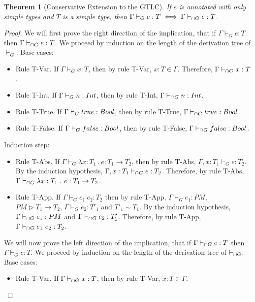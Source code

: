 \documentclass[a4paper]{article}
\newtheorem{theorem}{Theorem}[section]
\begin{document}
\begin{theorem}[Conservative Extension to the GTLC]
\label{conservative_extension_intersection_type_system}
If $e$ is annotated with only simple types and $T$ is a simple type, then $\Gamma \vdash_{G} e : T \iff \Gamma \vdash_{\cap G} e : T$.
\end{theorem}
\begin{proof}
We will first prove the right direction of the implication, that if $\Gamma \vdash_{G} e : T$ then $\Gamma \vdash_{\cap G} e : T$.
We proceed by induction on the length of the derivation tree of $\vdash_{G}$.
Base cases:
\begin{itemize}
    \item Rule T-Var.
    If $\Gamma \vdash_{G} x : T$, then by rule T-Var, $x : T \in \Gamma$.
    Therefore, $\Gamma \vdash_{\cap G} x : T$.
    \item Rule T-Int.
    If $\Gamma \vdash_{G} n : {Int}$, then by rule T-Int, $\Gamma \vdash_{\cap G} n : {Int}$.
    \item Rule T-True.
    If $\Gamma \vdash_{G} true : Bool$, then by rule T-True, $\Gamma \vdash_{\cap G} true : Bool$.
    \item Rule T-False.
    If $\Gamma \vdash_{G} false : Bool$, then by rule T-False, $\Gamma \vdash_{\cap G} false : Bool$.
\end{itemize}
Induction step:
\begin{itemize}
    \item Rule T-Abs.
    If $\Gamma \vdash_{G} \lambda x : T_1\ .\ e : T_1 \rightarrow T_2$, then by rule T-Abs, $\Gamma, x : T_1 \vdash_{G} e : T_2$.
        By the induction hypothesis, $\Gamma, x : T_1 \vdash_{\cap G} e : T_2$.
        Therefore, by rule T-Abs, $\Gamma \vdash_{\cap G} \lambda x : T_1\ .\ e : T_1 \rightarrow T_2$.
    \item Rule T-App.
    If $\Gamma \vdash_{G} e_1\ e_2 : T_2$ then by rule T-App, $\Gamma \vdash_{G} e_1 : PM$, $PM \rhd T_1 \rightarrow T_2$, $\Gamma \vdash_{G} e_2 : T'_1$ and $T'_1 \sim T_1$.
        By the induction hypothesis, $\Gamma \vdash_{\cap G} e_1 : PM$ and $\Gamma \vdash_{\cap G} e_2 : T_1'$.
        Therefore, by rule T-App, $\Gamma \vdash_{\cap G} e_1\ e_2 : T_2$.
\end{itemize}
We will now prove the left direction of the implication, that if $\Gamma \vdash_{\cap G} e : T$ then $\Gamma \vdash_{G} e : T$.
We proceed by induction on the length of the derivation tree of $\vdash_{\cap G}$.
Base cases:
\begin{itemize}
    \item Rule T-Var.
    If $\Gamma \vdash_{\cap G} x : T$, then by rule T-Var, $x : T \in \Gamma$.

\end{itemize}
\end{proof}
\end{document}
